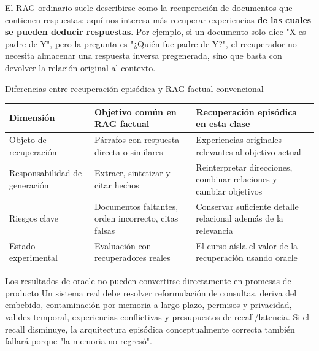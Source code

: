 \documentclass[a4paper]{article}
\begin{document}
El RAG ordinario suele describirse como la recuperación de documentos que contienen respuestas; aquí nos interesa más recuperar experiencias \textbf{de las cuales se pueden deducir respuestas}. Por ejemplo, si un documento solo dice "X es padre de Y", pero la pregunta es "¿Quién fue padre de Y?", el recuperador no necesita almacenar una respuesta inversa pregenerada, sino que basta con devolver la relación original al contexto.

\begin{knowledgebox}{Diferencias entre recuperación episódica y RAG factual convencional}
\begin{tabularx}{\textwidth}{L{0.24\textwidth}X X}
\toprule
Dimensión & Objetivo común en RAG factual & Recuperación episódica en esta clase \\
\midrule
Objeto de recuperación & Párrafos con respuesta directa o similares & Experiencias originales relevantes al objetivo actual \\
Responsabilidad de generación & Extraer, sintetizar y citar hechos & Reinterpretar direcciones, combinar relaciones y cambiar objetivos \\
Riesgos clave & Documentos faltantes, orden incorrecto, citas falsas & Conservar suficiente detalle relacional además de la relevancia \\
Estado experimental & Evaluación con recuperadores reales & El curso aísla el valor de la recuperación usando oracle \\
\bottomrule
\end{tabularx}
\end{knowledgebox}


\begin{warningbox}{Los resultados de oracle no pueden convertirse directamente en promesas de producto}
Un sistema real debe resolver reformulación de consultas, deriva del embebido, contaminación por memoria a largo plazo, permisos y privacidad, validez temporal, experiencias conflictivas y presupuestos de recall/latencia. Si el recall disminuye, la arquitectura episódica conceptualmente correcta también fallará porque "la memoria no regresó".
\end{warningbox}
\end{document}
